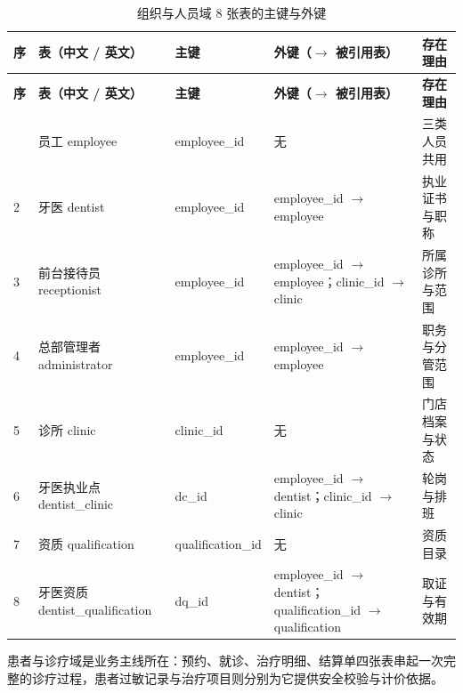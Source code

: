 \documentclass[11pt,a4paper]{ctexart}
\begin{document}
{\footnotesize
\begin{longtable}{@{}L{0.9cm}L{3.2cm}L{2.6cm}L{5.2cm}L{2.6cm}@{}}
\caption{组织与人员域 8 张表的主键与外键}\label{tab:tbl-org}\\
\toprule
\textbf{\textcolor{adcblue!92}{序}} & \textbf{\textcolor{adcblue!92}{表（中文 / 英文）}} & \textbf{\textcolor{adcblue!92}{主键}} & \textbf{\textcolor{adcblue!92}{外键（$\rightarrow$ 被引用表）}} & \textbf{\textcolor{adcblue!92}{存在理由}} \\
\midrule
\endfirsthead
\toprule
\textbf{\textcolor{adcblue!92}{序}} & \textbf{\textcolor{adcblue!92}{表（中文 / 英文）}} & \textbf{\textcolor{adcblue!92}{主键}} & \textbf{\textcolor{adcblue!92}{外键（$\rightarrow$ 被引用表）}} & \textbf{\textcolor{adcblue!92}{存在理由}} \\
\midrule
\endhead
\bottomrule
{} & 员工 employee & employee\_id & 无 & 三类人员共用 \\
2 & 牙医 dentist & employee\_id & employee\_id $\rightarrow$ employee & 执业证书与职称 \\
3 & 前台接待员 receptionist & employee\_id & employee\_id $\rightarrow$ employee；clinic\_id $\rightarrow$ clinic & 所属诊所与范围 \\
4 & 总部管理者 administrator & employee\_id & employee\_id $\rightarrow$ employee & 职务与分管范围 \\
5 & 诊所 clinic & clinic\_id & 无 & 门店档案与状态 \\
6 & 牙医执业点 dentist\_clinic & dc\_id & employee\_id $\rightarrow$ dentist；clinic\_id $\rightarrow$ clinic & 轮岗与排班 \\
7 & 资质 qualification & qualification\_id & 无 & 资质目录 \\
8 & 牙医资质 dentist\_qualification & dq\_id & employee\_id $\rightarrow$ dentist；qualification\_id $\rightarrow$ qualification & 取证与有效期 \\
\end{longtable}
}

患者与诊疗域是业务主线所在：预约、就诊、治疗明细、结算单四张表串起一次完整的诊疗过程，患者过敏记录与治疗项目则分别为它提供安全校验与计价依据。
\end{document}
